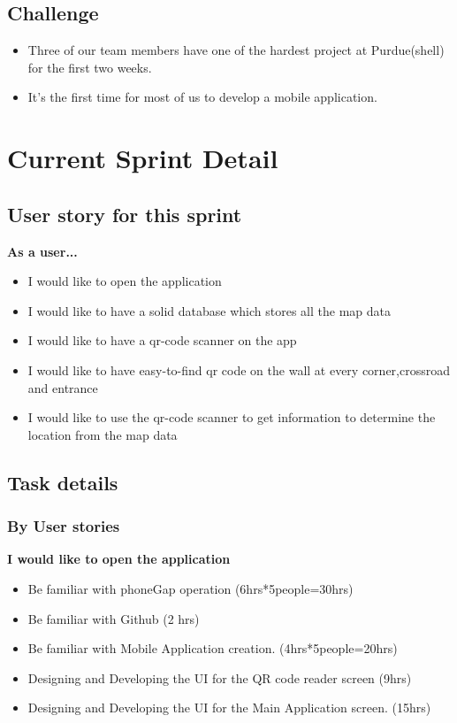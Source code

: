 \documentclass[12pt]{article}
\begin{document}
\subsection{Challenge}

\begin{itemize}
\item Three of our team members have one of the hardest project at Purdue(shell) for the first two weeks.
\item It's the first time for most of us to develop a mobile application.
\end{itemize}

\section{Current Sprint Detail}

\subsection{User story for this sprint}

\textbf{As a user...}
\begin{itemize}
\item I would like to open the application 
\item I would like to have a solid database which stores all the map data
\item I would like to have a qr-code scanner on the app
\item I would like to have easy-to-find qr code on the wall at every corner,crossroad and entrance
\item I would like to use the qr-code scanner to get information to determine the location from the map data


\end{itemize}

\subsection{Task details}

\subsubsection{By User stories}
\textbf{I would like to open the application}
\begin{itemize}
\item Be familiar with phoneGap operation (6hrs*5people=30hrs)
\item Be familiar with Github  (2 hrs)
\item Be familiar with Mobile Application creation. (4hrs*5people=20hrs)
\item Designing and Developing the UI for the QR code reader screen (9hrs)
\item Designing and Developing the UI for the Main Application screen. (15hrs)
\end{itemize}
\end{document}
